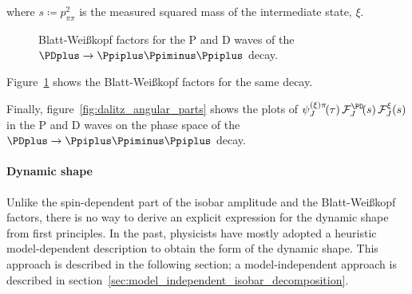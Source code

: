    where $s \coloneqq p_{\pi\pi}^2$ is the measured squared mass of the intermediate state, $\xi$.
    \begin{figure}
        \centering
        \subfloat[][P wave.]{}

        \subfloat[][D wave.]{}

        \caption{Blatt-Wei\ss{}kopf factors for the P and D waves of the $\PDplus\to\Ppiplus\Ppiminus\Ppiplus$ decay.}
        \label{fig:blatt_weisskopf}
    \end{figure}
    Figure~\ref{fig:blatt_weisskopf} shows the Blatt-Wei\ss{}kopf factors for the same decay.


    Finally, figure~\ref{fig:dalitz_angular_parts} shows the plots of $\psi_J^{(\xi)\pi}\!(\tau)\,\mathcal{F}_J^{\PD}\!(s)\,\mathcal{F}_J^{\xi}(s)$ in the P and D waves on the phase space of the $\PDplus\to\Ppiplus\Ppiminus\Ppiplus$ decay.

    \paragraph{Dynamic shape}
    Unlike the spin-dependent part of the isobar amplitude and the Blatt-Wei\ss{}kopf factors, there is no way to derive an explicit expression for the dynamic shape from first principles.
    In the past, physicists have mostly adopted a heuristic model-dependent description to obtain the form of the dynamic shape.
    This approach is described in the following section; a model-independent approach is described in section~\ref{sec:model_independent_isobar_decomposition}.


    
    

